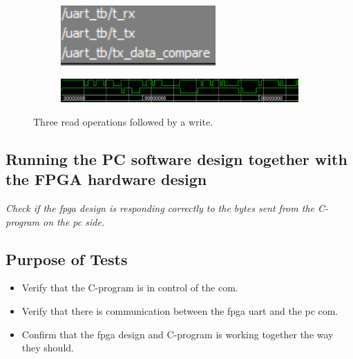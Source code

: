 \documentclass[main.tex]{subfiles}
\begin{document}
\begin{figure}
    \centering
    \begin{subfigure}{0.18\textwidth}
        \centering
        \includegraphics[width=\linewidth]{../img/uart_tb_0}
    \end{subfigure}%
    \begin{subfigure}{0.7\textwidth}
        \centering
        \includegraphics[width=\linewidth]{../img/uart_tb_1}
    \end{subfigure}
    \caption{Three read operations followed by a write. }
    \label{fig:uarttb}
\end{figure}

\subsection{Running the PC software design together with the FPGA hardware design} \label{test:designrun}

\textit{Check if the \gls{fpga} design is responding correctly to the bytes sent from the C-program on the \gls{pc} side.} 

\subsection{Purpose of Tests}
\begin{itemize}\setlength{\itemsep}{10pt}
\item Verify that the C-program is in control of the \gls{com}.
\item Verify that there is communication between the \gls{fpga} \gls{uart} and the \gls{pc} \gls{com}.
\item Confirm that the \gls{fpga} design and C-program is working together the way they should.
\end{itemize}
\end{document}
